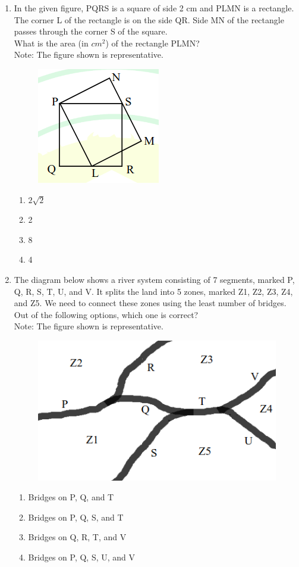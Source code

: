 \documentclass[journal]{IEEEtran}
\theoremstyle{remark}
\begin{document}
\begin{enumerate}[resume]
\item In the given figure, PQRS is a square of side 2 cm and PLMN is a rectangle. The corner L of the rectangle is on the side QR. Side MN of the rectangle passes through the corner S of the square. \hfill{} \\
What is the area (in $cm^2$) of the rectangle PLMN? \\
Note: The figure shown is representative.
\begin{figure}[H]
    \centering
    \includegraphics[width=0.2\columnwidth]{figs/Q.9.png}
    \caption{}
    \label{fig.placeholder}
\end{figure}
\begin{multicols}{4}
\begin{enumerate}
\item $2\sqrt{2}$
\item 2
\item 8
\item 4
\end{enumerate}
\end{multicols}

\item The diagram below shows a river system consisting of 7 segments, marked P, Q, R, S, T, U, and V. It splits the land into 5 zones, marked Z1, Z2, Z3, Z4, and Z5. We need to connect these zones using the least number of bridges. Out of the following options, which one is correct? \hfill{} \\
Note: The figure shown is representative.
\begin{figure}[H]
    \centering
    \includegraphics[width=0.5\columnwidth]{figs/Q.10.png}
    \caption{}
    \label{fig.placeholder}
\end{figure}
\begin{enumerate}
\item Bridges on P, Q, and T
\item Bridges on P, Q, S, and T
\item Bridges on Q, R, T, and V
\item Bridges on P, Q, S, U, and V
\end{enumerate}
\end{enumerate}
\end{document}
